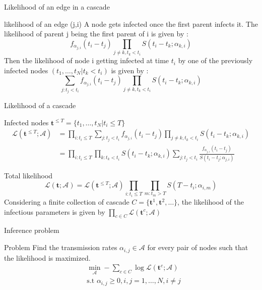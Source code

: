 \documentclass{beamer}
\begin{document}
\begin{frame}{Likelihood of an edge in a cascade}
\begin{block}{likelihood of an edge (j,i)}
A node gets infected once the \alert{first} parent infects it. The likelihood of parent j being the first parent of i is given by :
\begin{equation}
    f_{\alpha_{j,i}}(t_i-t_j) \prod_{j\neq k,t_k<t_i}S(t_i-t_k;\alpha_{k,i})
\end{equation}
Then the likelihood of node i getting infected at time $t_i$ by one of the previously infected nodes $(t_1,\dots,t_N|t_k<t_i)$ is given by :
\begin{equation}
    \sum_{j:t_j<t_i}f_{\alpha_{j,i}}(t_i-t_j)\prod_{j\neq k,t_k<t_i}S(t_i-t_k;\alpha_{k,i})
\end{equation}
\end{block}
\end{frame}
\begin{frame}{Likelihood of a cascade}
\begin{block}{Infected nodes}
$\textbf{t}^{\leq T} = \{t_1,\dots,t_N|t_i\leq T\}$
    \begin{equation}
        \begin{split}
            \mathscr{L}(\mathbf{t}^{\leq T};\mathscr{A}) &= \prod_{i:t_i \leq T}\sum_{j:t_j<t_i}f_{\alpha_{j,i}}(t_i-t_j)\prod_{j\neq k,t_k<t_i}S(t_i-t_k;\alpha_{k,i})\\
            &= \prod_{i : t_i\leq T}\prod_{k:t_k<t_i}S(t_i-t_k;\alpha_{k,i}) \sum_{j:t_j<t_i}\frac{f_{\alpha_{j,i}}(t_i-t_j)}{S(t_i-t_j;\alpha_{j,i})}
        \end{split}
    \end{equation}
\end{block}
\begin{block}{Total likelihood}
\begin{equation}
    \mathscr{L}(\textbf{t};\mathscr{A}) = \mathscr{L}(\textbf{t}^{\leq T};\mathscr{A}) \prod_{i:t_i\leq T}\prod_{m:t_m>T}S(T-t_i;\alpha_{i,m})
\end{equation}
Considering a finite collection of cascade $C = \{\textbf{t}^1,\textbf{t}^2,\dots\}$, the likelihood of the infectious parameters is given by $\prod_{c \in C}\mathscr{L}(\textbf{t}^c;\mathscr{A})$
\end{block}
\end{frame}
\begin{frame}{Inference problem}
    \begin{block}{Problem}
    Find the transmission rates $\alpha_{i,j} \in \mathscr{A}$ for every pair of nodes such that the likelihood is maximized.
    \begin{equation}
    \begin{split}
        &\min_{\mathscr{A}} -\sum_{c\in C}\log \mathscr{L}(\textbf{t}^c;\mathscr{A})\\
        &\text{s.t  } \alpha_{i,j}\geq 0, i,j = 1,\dots,N, i\neq j
    \end{split}
    \end{equation}

    \end{block}
\end{frame}
\end{document}
